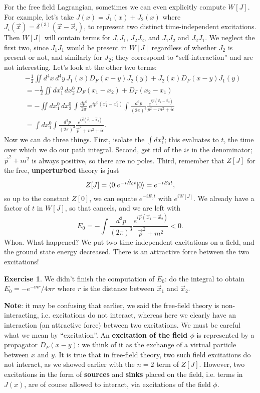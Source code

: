 \documentclass{report}
\theoremstyle{plain}
\theoremstyle{definition}
\newtheorem{exercise}{Exercise}[section]
\theoremstyle{remark}
\begin{document}
For the free field Lagrangian, sometimes we can even explicitly
compute $W[J]$. For example, let's take $J(x) = J_1(x) + J_2(x)$ where
$J_i(\vec x) = \delta^{(3)}(\vec{x} - \vec{x}_i)$, to represent two
distinct time-independent excitations. Then $W[J]$ will contain terms
for $J_1J_1$, $J_2J_2$, and $J_1J_2$ and $J_2J_1$. We neglect the
first two, since $J_1J_1$ would be present in $W[J]$ regardless of
whether $J_2$ is present or not, and similarly for $J_2$; they
correspond to ``self-interaction'' and are not interesting. Let's look
at the other two terms:
\begin{align*}
  &-\frac{1}{2} \iint d^4x \, d^4y \, J_1(x) D_F(x - y) J_2(y) + J_2(x) D_F(x - y) J_1(y) \\
  &= -\frac{1}{2} \iint dx_1^0 \, dx_2^0 \, D_F(x_1 - x_2) + D_F(x_2 - x_1) \\
  &= -\iint dx_1^0 \, dx_2^0 \, \int \frac{dp^0}{2\pi} \, e^{ip^0(x_1^0 - x_2^0)} \int \frac{d^3p}{(2\pi)^3} \frac{e^{i\vec{p}(\vec{x}_1 - \vec{x}_2)}}{p^2 - m^2 + i\epsilon} \\
  &= \int dx_1^0 \int \frac{d^3p}{(2\pi)^3} \frac{e^{i\vec{p}(\vec{x}_1 - \vec{x}_2)}}{\vec{p}^2 + m^2 + i\epsilon}.
\end{align*}
Now we can do three things. First, isolate the $\int dx_1^0$; this
evaluates to $t$, the time over which we do our path integral. Second,
get rid of the $i\epsilon$ in the denominator; $\vec{p}^2 + m^2$ is
always positive, so there are no poles. Third, remember that $Z[J]$
for the free, {\bf unperturbed} theory is just
$$ Z[J] = \braket{0|e^{-i\hat{H}_0t}|0} = e^{-iE_0 t}, $$
so up to the constant $Z[0]$, we can equate $e^{-iE_0t}$ with
$e^{iW[J]}$. We already have a factor of $t$ in $W[J]$, so that
cancels, and we are left with
$$ E_0 = -\int \frac{d^3p}{(2\pi)^3} \frac{e^{i\vec{p}(\vec{x}_1 - \vec{x}_2)}}{\vec{p}^2 + m^2} < 0. $$
Whoa. What happened? We put two time-independent excitations on a
field, and the ground state energy decreased. There is an attractive
force between the two excitations!

\begin{exercise}
  We didn't finish the computation of $E_0$: do the integral to obtain
  $E_0 = -e^{-mr}/4\pi r$ where $r$ is the distance between
  $\vec{x}_1$ and $\vec{x}_2$.
\end{exercise}

{\bf Note}: it may be confusing that earlier, we said the free-field
theory is non-interacting, i.e. excitations do not interact, whereas
here we clearly have an interaction (an attractive force) between two
excitations. We must be careful what we mean by ``excitation''. An
{\bf excitation of the field $\phi$} is represented by a propagator
$D_F(x - y)$: we think of it as the exchange of a virtual particle
between $x$ and $y$. It is true that in free-field theory, two such
field excitations do not interact, as we showed earlier with the
$n = 2$ term of $Z[J]$. However, two excitations in the form of {\bf
  sources} and {\bf sinks} placed on the field, i.e. terms in $J(x)$,
are of course allowed to interact, via excitations of the field
$\phi$.
\end{document}
